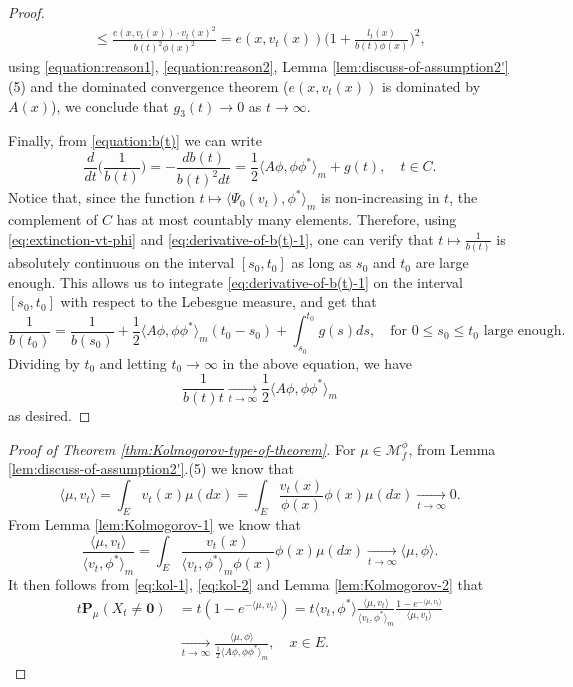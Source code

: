 \documentclass[UTF8]{pkuthss}
\theoremstyle{plain}
\theoremstyle{definition}
\numberwithin{equation}{section}
\begin{document}
\begin{proof}
\[\begin{split}
	\leq \frac{e(x,v_t(x))\cdot v_t(x)^2}{ b(t)^2\phi(x)^2}
	= e(x,v_t(x))\Big(1+\frac{l_t(x)}{ b(t) \phi(x)}\Big)^2,
\end{split}\]
	using \eqref{equation:reason1}, \eqref{equation:reason2}, Lemma \ref{lem:discuss-of-assumption2'} (5) and the dominated convergence theorem 
	($e(x,v_t(x))$ is dominated by $ A(x)$), we conclude that $g_3(t)\to 0$ as $t\to\infty$.
\par
	Finally, from \eqref{equation:b(t)} we can write
\begin{equation}\label{eq:derivative-of-b(t)-1}
	\frac{d}{dt} \Big(\frac{1}{b(t)}\Big)
	= -\frac{d b(t)}{b(t)^2dt}
	= \frac{1}{2}\langle  A\phi,\phi\phi^*\rangle_m + g(t),
	\quad t\in C.
\end{equation}
	Notice that, since the function $t\mapsto \langle\Psi_0(v_t),\phi^*\rangle_m$ is non-increasing in $t$, 
		the complement of $C$ has at most countably many elements.
	Therefore, using \eqref{eq:extinction-vt-phi} and \eqref{eq:derivative-of-b(t)-1}, one can verify that $t\mapsto \frac{1}{b(t)}$ is absolutely continuous on the interval $[s_0,t_0]$ as long as $s_0$ and $t_0$ are large enough.
	This allows us to integrate \eqref{eq:derivative-of-b(t)-1} on the interval $[s_0,t_0]$ with respect to the Lebesgue measure, and get that
\[
	\frac{1}{b(t_0)}
	= \frac{1}{b(s_0)} + \frac{1}{2}\langle A\phi,\phi\phi^*\rangle_m(t_0-s_0) + \int_{s_0}^{t_0} g(s)ds,
	\quad \text{for } 0\leq s_0\leq t_0 \text{ large enough}.
\]
	Dividing by $t_0$ and letting $t_0\to\infty$ in the above equation, we have
\[
	\frac{1}{b(t)t}
	\xrightarrow[t\to\infty]{} \frac{1}{2}\langle  A\phi,\phi\phi^*\rangle_m
\]
	as desired.
\end{proof}
\begin{proof}[Proof of Theorem \ref{thm:Kolmogorov-type-of-theorem}]
	For $\mu \in \mathcal M^\phi_f$, from Lemma \ref{lem:discuss-of-assumption2'}.(5) we know that
\begin{equation}\label{eq:kol-1}
	\langle \mu ,v_t\rangle
    = \int_E v_t(x) \mu(dx)
	= \int_E \frac{v_t(x)}{\phi(x)} \phi(x)\mu(dx)
	\xrightarrow[t\to\infty]{} 0.
\end{equation}
	From Lemma \ref{lem:Kolmogorov-1} we know that
\begin{equation}\label{eq:kol-2}
     \frac {\langle\mu, v_t\rangle}{ \langle v_t,\phi^*\rangle_m}
	= \int_E \frac{v_t(x)}{\langle v_t, \phi^* \rangle_m \phi(x)}\phi(x)\mu(dx)
	\xrightarrow[t\to\infty]{} \langle \mu,\phi\rangle.
\end{equation}
	It then follows from \eqref{eq:kol-1}, \eqref{eq:kol-2} and Lemma \ref{lem:Kolmogorov-2} that
\[\begin{split}
	t\mathbf P_{\mu}(X_t\neq \mathbf 0)
	&= t (1-e^{-\langle \mu, v_t \rangle})
	= t \langle v_t,\phi^*\rangle\frac{\langle \mu,v_t\rangle }{\langle v_t,\phi^*\rangle_m} \frac {1-e^{-\langle \mu, v_t \rangle}} {\langle \mu, v_t \rangle}\\
	&\xrightarrow[t\to\infty]{} \frac{\langle \mu,\phi\rangle} {\frac{1}{2}\langle  A \phi,\phi \phi^*\rangle_m},
	\quad x\in E.
\end{split}\]
\end{proof}
\end{document}
